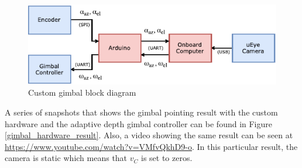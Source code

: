 \begin{figure}[htbp]
	\centering
	\includegraphics[width=0.8\linewidth]{images/chapter2/gimbal_system_blockdiagram}
	\caption{Custom gimbal block diagram}
	\label{gimbal_blockdiagram}
\end{figure}
A series of snapshots that shows the gimbal pointing result with the custom hardware and the adaptive depth gimbal controller can be found in Figure \ref{gimbal_hardware_result}. Also, a video showing the same result can be seen at \href{https://www.youtube.com/watch?v=VMfvQkhD9-o}{https://www.youtube.com/watch?v=VMfvQkhD9-o}. In this particular result, the camera is static which means that $v_{C}$ is set to zeros.
